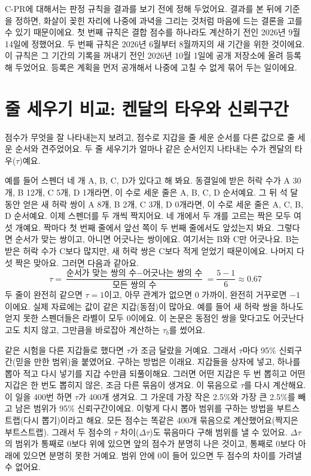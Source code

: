 C-PR에 대해서는 판정 규칙을 결과를 보기 전에 정해 두었어요. 결과를 본 뒤에 기준을 정하면, 화살이 꽂힌 자리에 나중에 과녁을 그리는 것처럼 마음에 드는 결론을 고를 수 있기 때문이에요. 첫 번째 규칙은 결합 점수를 하나라도 계산하기 전인 2026년 9월 14일에 정했어요. 두 번째 규칙은 2026년 6월부터 8월까지의 새 기간을 위한 것이에요. 이 규칙은 그 기간의 기록을 꺼내기 전인 2026년 10월 1일에 공개 저장소에 올려 등록해 두었어요. 등록은 계획을 먼저 공개해서 나중에 고칠 수 없게 묶어 두는 일이에요.

\section*{줄 세우기 비교: 켄달의 타우와 신뢰구간}

점수가 무엇을 잘 나타내는지 보려고, 점수로 지갑을 줄 세운 순서를 다른 값으로 줄 세운 순서와 견주었어요. 두 줄 세우기가 얼마나 같은 순서인지 나타내는 수가 켄달의 타우($\tau$)예요.

예를 들어 스펜더 네 개 A, B, C, D가 있다고 해 봐요. 동결일에 받은 허락 수가 A 30개, B 12개, C 5개, D 1개라면, 이 수로 세운 줄은 A, B, C, D 순서예요. 그 뒤 석 달 동안 얻은 새 허락 쌍이 A 8개, B 2개, C 3개, D 0개라면, 이 수로 세운 줄은 A, C, B, D 순서예요. 이제 스펜더를 두 개씩 짝지어요. 네 개에서 두 개를 고르는 짝은 모두 여섯 개예요. 짝마다 첫 번째 줄에서 앞선 쪽이 두 번째 줄에서도 앞섰는지 봐요. 그렇다면 순서가 맞는 쌍이고, 아니면 어긋나는 쌍이에요. 여기서는 B와 C만 어긋나요. B는 받은 허락 수가 C보다 많지만, 새 허락 쌍은 C보다 적게 얻었기 때문이에요. 나머지 다섯 짝은 맞아요. 그러면 다음과 같아요.
\[
\tau=\frac{\text{순서가 맞는 쌍의 수}-\text{어긋나는 쌍의 수}}{\text{모든 쌍의 수}}=\frac{5-1}{6}\approx 0.67
\]
두 줄이 완전히 같으면 $\tau=1$이고, 아무 관계가 없으면 0 가까이, 완전히 거꾸로면 $-1$이에요. 실제 자료에는 값이 같은 지갑(동점)이 많아요. 예를 들어 새 허락 쌍을 하나도 얻지 못한 스펜더들은 라벨이 모두 0이에요. 이 논문은 동점인 쌍을 맞다고도 어긋난다고도 치지 않고, 그만큼을 바로잡아 계산하는 $\tau_b$를 썼어요.

같은 시험을 다른 지갑들로 했다면 $\tau$가 조금 달랐을 거예요. 그래서 $\tau$마다 95\% 신뢰구간(믿을 만한 범위)을 붙였어요. 구하는 방법은 이래요. 지갑들을 상자에 넣고, 하나를 뽑아 적고 다시 넣기를 지갑 수만큼 되풀이해요. 그러면 어떤 지갑은 두 번 뽑히고 어떤 지갑은 한 번도 뽑히지 않은, 조금 다른 묶음이 생겨요. 이 묶음으로 $\tau$를 다시 계산해요. 이 일을 400번 하면 $\tau$가 400개 생겨요. 그 가운데 가장 작은 2.5\%와 가장 큰 2.5\%를 빼고 남은 범위가 95\% 신뢰구간이에요. 이렇게 다시 뽑아 범위를 구하는 방법을 부트스트랩(다시 뽑기)이라고 해요. 모든 점수는 똑같은 400개 묶음으로 계산했어요(짝지은 부트스트랩). 그래서 두 점수의 $\tau$ 차이($\Delta\tau$)도 묶음마다 구해 범위를 낼 수 있어요. $\Delta\tau$의 범위가 통째로 0보다 위에 있으면 앞의 점수가 분명히 나은 것이고, 통째로 0보다 아래에 있으면 분명히 못한 거예요. 범위 안에 0이 들어 있으면 두 점수의 차이를 가려낼 수 없어요.

